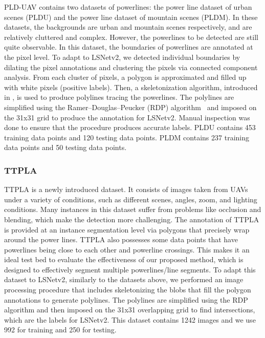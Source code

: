 \documentclass[journal]{IEEEtran}
\begin{document}
PLD-UAV \cite{PLD_UAV} contains two datasets of powerlines: the power line dataset of urban scenes (PLDU) and the power line dataset of mountain scenes (PLDM). In these datasets, the backgrounds are urban and mountain scenes respectively, and are relatively cluttered and complex. However, the powerlines to be detected are still quite observable. In this dataset, the boundaries of powerlines are annotated at the pixel level. To adapt to LSNetv2, we detected individual boundaries by dilating the pixel annotations and clustering the pixels via connected component analysis. From each cluster of pixels, a polygon is approximated and filled up with white pixels (positive labels). Then, a skeletonization algorithm, introduced in \cite{skeleton}, is used to produce polylines tracing the powerlines. The polylines are simplified using the Ramer–Douglas–Peucker (RDP) algorithm~\cite{RDP} and imposed on the 31x31 grid to produce the annotation for LSNetv2. Manual inspection was done to ensure that the procedure produces accurate labels. PLDU contains 453 training data points and 120 testing data points. PLDM contains 237 training data points and 50 testing data points.

\subsubsection{TTPLA}

TTPLA \cite{TTPLA} is a newly introduced dataset. It consists of images taken from UAVs under a variety of conditions, such as different scenes, angles, zoom, and lighting conditions. Many instances in this dataset suffer from problems like occlusion and blending, which make the detection more challenging. The annotation of TTPLA is provided at an instance segmentation level via polygons that precisely wrap around the power lines. TTPLA also possesses some data points that have powerlines being close to each other and powerline crossings. This makes it an ideal test bed to evaluate the effectiveness of our proposed method, which is designed to effectively segment multiple powerlines/line segments. To adapt this dataset to LSNetv2, similarly to the datasets above, we performed an image processing procedure that includes skeletonizing the blobs that fill the polygon annotations to generate polylines. The polylines are simplified using the RDP algorithm and then imposed on the 31x31 overlapping grid to find intersections, which are the labels for LSNetv2. This dataset contains 1242 images and we use 992 for training and 250 for testing.
\end{document}
